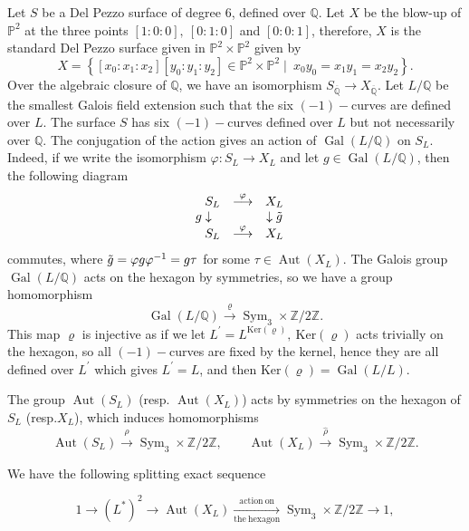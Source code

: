 \documentclass[leqno,12pt]{amsart} %
\newcommand{\Z}{\ensuremath{\mathbb{Z}}}
\newcommand{\Q}{\ensuremath{\mathbb{Q} }}
\newcommand{\p}{\ensuremath{\mathbb{P} }}
\DeclareMathOperator{\Aut}{Aut}
\DeclareMathOperator{\Gal}{Gal}
\DeclareMathOperator{\sym}{Sym}
\begin{document}
Let $S$ be a Del Pezzo surface of degree $6$, defined over $\Q $. Let $X$ be the blow-up of $\p^2$ at the three points $[1:0:0],~[0:1:0]$ and $[0:0:1]$, therefore, $X$ is the standard Del Pezzo surface given in $\p^2 \times \p^2$ given by
\[X=\left\{[x_0:x_1:x_2][y_0:y_1:y_2]\in \p^2\times \p^2\mid ~x_0y_0=x_1y_1=x_2y_2\right\}.\]
Over the algebraic closure of $\Q $, we have an isomorphism $S_{\overline{\Q }}\rightarrow X_{\overline{\Q }}$. Let $L/\Q $ be the smallest Galois field extension such that the six $(-1)-$curves are defined over $L$. The surface $S$ has six $(-1)-$curves defined over $L$ but not necessarily over $\Q $. The conjugation of the action gives an action of $\Gal(L/\Q )$ on $S_{L}$. Indeed, if we write the isomorphism $\varphi: S_L\rightarrow X_L$ and let $g\in \Gal(L/\Q )$, then the following diagram 
\begin{equation*}
   \begin{array}{ccc}
     \hspace{5mm} S_L &\stackrel{\varphi }{\longrightarrow}&X_L \\
   g \downarrow& &  \downarrow \Tilde{g} \\
    \hspace{5mm} S_L & \stackrel{\varphi }{\longrightarrow}&X_L
    \end{array}
\end{equation*}
commutes, where $\Tilde{g}=\varphi g\varphi^{-1}=g \tau$ for some $\tau\in \Aut(X_L)$. The Galois group $\Gal(L/\Q )$ acts on the hexagon by symmetries, so we have a group homomorphism
\[\Gal(L/\Q ) \stackrel{\varrho }{\longrightarrow} \sym_3 \times \Z /2 \Z .\]
This map $\varrho$ is injective as if we let $L^{\prime}=L^{\mathrm{Ker}(\varrho)},~\mathrm{Ker}(\varrho)$ acts trivially on the hexagon, so all $(-1)-$curves are fixed by the kernel, hence they are all defined over $L^{\prime}$ which gives $L^{\prime}=L$, and then $\mathrm{Ker}(\varrho)=\Gal(L/L)$. 
 
The group $\Aut(S_{L})$ (resp. $\Aut(X_L)$) acts by symmetries on the hexagon of $S_{L}$ (resp.$X_{L}$), which induces homomorphisms
\[\Aut(S_{L})\stackrel{\rho }{\longrightarrow} \sym_3 \times \Z /2\Z ,~~~~~~~~~\Aut(X_{L})\stackrel{\hat{\rho} }{\longrightarrow} \sym_3 \times \Z /2\Z .\]
 
We have the following splitting exact sequence 
 
\begin{equation}\label{Aut:X_L:exact}
1 \stackrel{~ }{\rightarrow}\left(L^{*}\right)^2\stackrel{~ }{\rightarrow} \Aut(X_L) \xrightarrow[\mathrm{the~hexagon}]{\mathrm{action~on}} \sym_3\times \Z /2\Z \stackrel{~ }{\rightarrow}1,
\end{equation}
 
\end{document}

